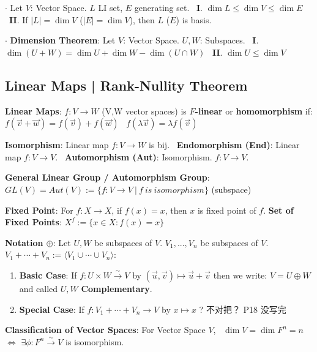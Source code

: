 \documentclass[9pt]{article}
\newcommand{\bij}{\stackrel{\sim}{\rightarrow}}
\begin{document}
$\cdot$ Let $V$: Vector Space. $L$ LI set, $E$ generating set. \ \textbf{I}. $\dim L\leq \dim V\leq\dim E$ \ \textbf{II}. If $|L|=\dim V$ ($|E|=\dim V$), then $L$ ($E$) is basis.

$\cdot$ \textbf{Dimension Theorem}: Let $V$: Vector Space. $U,W$: Subspaces. \ \textbf{I}. $\dim(U+W)=\dim U+\dim W-\dim(U\cap W)$ \ \textbf{II}. $\dim U\leq\dim V$


\subsection{Linear Maps | Rank-Nullity Theorem}

\textbf{Linear Maps}: $f:V\to W$ {\small (V,W vector spaces) is \textbf{$F$-linear} or \textbf{homomorphism} if: \quad $f(\vec{v}+\vec{w})=f(\vec{v})+f(\vec{w})$ \ $f(\lambda\vec{v})=\lambda f(\vec{v})$ }

\textbf{Isomorphism}: {\small Linear map $f:V\to W$ is bij. \ \textbf{Endomorphism (End)}: Linear map $f:V\to V$. \ \textbf{Automorphism (Aut)}: Isomorphism. $f:V\to V$.}

\textbf{General Linear Group / Automorphism Group}: $GL(V)=Aut(V):=\{f:V\to V \ | \ f \ is \ isomorphism\}$ {\scriptsize (subspace)}

\textbf{Fixed Point}: For $f:X\to X$, if $f(x)=x$, then $x$ is fixed point of $f$. \quad \textbf{Set of Fixed Points}: $X^f:=\{x\in X:f(x)=x\}$

\textbf{Notation $\oplus$}: Let $U,W$ be subspaces of $V$. \quad $V_1,...,V_n$ be subspaces of $V$. \quad \quad $V_1+\cdots+V_n:=\langle V_1\cup\cdots\cup V_n\rangle$:

\begin{enumerate}[itemsep=-2pt, topsep=-2pt]
    \item \textbf{Basic Case}: If $f:U\times W\bij V$ by $(\vec{u},\vec{v})\mapsto\vec{u}+\vec{v}$ then we write: $V=U\oplus W$ and called $U,W$ \textbf{Complementary}.
    \item \textbf{Special Case}: If $f:V_1+\cdots+ V_n\to V$ by $x\mapsto x$ ? 不对把？ P18 没写完
\end{enumerate}

\textbf{Classification of Vector Spaces}: For Vector Space $V$, \ $\dim V = \dim F^n=n$ $\Leftrightarrow$ $\exists\phi:F^n\bij V$ is isomorphism.
\end{document}
